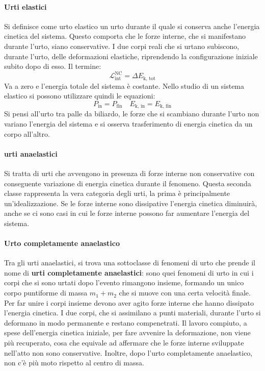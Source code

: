 \documentclass[10pt,a4paper]{book}
\begin{document}
\paragraph{Urti elastici} Si definisce come urto elastico un urto durante il quale si conserva anche l'energia cinetica del sistema. Questo comporta che le forze interne, che si manifestano durante l'urto, siano conservative. I due corpi reali che si urtano subiscono, durante l'urto, delle deformazioni elastiche, riprendendo la configurazione iniziale subito dopo di esso.
Il termine:
\[
	\mathcal{L}_\text{int}^\text{NC}=\Delta E_\text{k, tot}
\]
Va a zero e l'energia totale del sistema è costante.
Nello studio di un sistema elastico si possono utilizzare quindi le equazioni:
\[
	P_\text{in}=P_\text{fin} \quad E_\text{k, in}=E_\text{k, fin}
\]
Si pensi all'urto tra palle da biliardo, le forze che si scambiano durante l'urto non variano l'energia del sistema e si osserva trasferimento di energia cinetica da un corpo all'altro.

\paragraph{urti anaelastici} Si tratta di urti che avvengono in presenza di forze interne non conservative con conseguente variazione di energia cinetica durante il fenomeno. Questa seconda classe rappresenta la vera categoria degli urti, la prima è principalmente un'idealizzazione. Se le forze interne sono dissipative l'energia cinetica diminuirà, anche se ci sono casi in cui le forze interne possono far aumentare l'energia del sistema.

\paragraph{Urto completamente anaelastico} Tra gli urti anaelastici, si trova una sottoclasse di fenomeni di urto che prende il nome di \textbf{urti completamente anaelastici}: sono quei fenomeni di urto in cui i corpi che si sono urtati dopo l'evento rimangono insieme, formando un unico corpo puntiforme di massa $m_1+m_2$ che si muove con una certa velocità finale. Per far unire i corpi insieme devono aver agito forze interne che hanno dissipato l'energia cinetica. I due corpi, che si assimilano a punti materiali, durante l'urto si deformano in modo permanente e restano compenetrati. Il lavoro compiuto, a spese dell'energia cinetica iniziale, per fare avvenire la deformazione, non viene più recuperato, cosa che equivale ad affermare che le forze interne sviluppate nell'atto non sono conservative. Inoltre, dopo l'urto completamente anaelastico, non c'è più moto rispetto al centro di massa.
\end{document}
